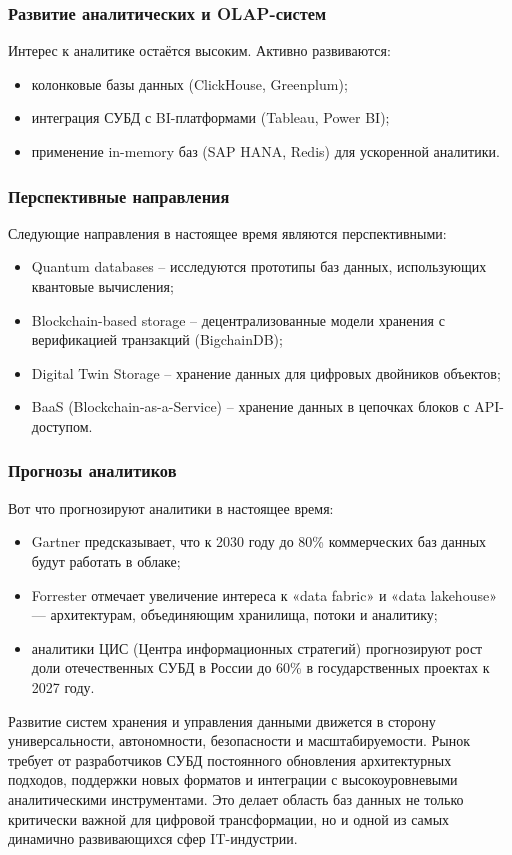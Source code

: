 \subsubsection{Развитие аналитических и OLAP-систем}

Интерес к аналитике остаётся высоким. Активно развиваются:
\begin{itemize}
	\item колонковые базы данных (ClickHouse, Greenplum);
	\item интеграция СУБД с BI-платформами (Tableau, Power BI);
	\item применение in-memory баз (SAP HANA, Redis) для ускоренной аналитики.
\end{itemize}

\subsubsection{Перспективные направления}

Следующие направления в настоящее время являются перспективными:

\begin{itemize}
	\item Quantum databases -- исследуются прототипы баз данных, использующих квантовые вычисления;
	\item Blockchain-based storage -- децентрализованные модели хранения с верификацией транзакций (BigchainDB);
	\item Digital Twin Storage -- хранение данных для цифровых двойников объектов;
	\item BaaS (Blockchain-as-a-Service) -- хранение данных в цепочках блоков с API-доступом.	
\end{itemize}

\subsubsection{Прогнозы аналитиков}

Вот что прогнозируют аналитики в настоящее время:

\begin{itemize}
	\item Gartner предсказывает, что к 2030 году до 80\% коммерческих баз данных будут работать в облаке;
	\item Forrester отмечает увеличение интереса к «data fabric» и «data lakehouse» — архитектурам, объединяющим хранилища, потоки и аналитику;
	\item аналитики ЦИС (Центра информационных стратегий) прогнозируют рост доли отечественных СУБД в России до 60\% в государственных проектах к 2027 году.	
\end{itemize}

Развитие систем хранения и управления данными движется в сторону универсальности, автономности, безопасности и масштабируемости. Рынок требует от разработчиков СУБД постоянного обновления архитектурных подходов, поддержки новых форматов и интеграции с высокоуровневыми аналитическими инструментами. Это делает область баз данных не только критически важной для цифровой трансформации, но и одной из самых динамично развивающихся сфер IT-индустрии.